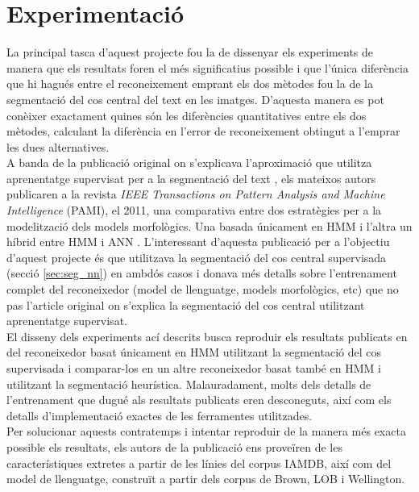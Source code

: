 \chapter{Experimentació} 
\label{cap:exp}
La principal tasca d'aquest projecte fou la de dissenyar els experiments de manera que els resultats foren el més significatius possible i que l'única diferència que hi hagués entre el reconeixement emprant els dos mètodes fou la de la segmentació del cos central del text en les imatges. D'aquesta manera es pot conèixer exactament quines són les diferències quantitatives entre els dos mètodes, calculant la diferència en l'error de reconeixement obtingut a l'emprar les dues alternatives.\\

A banda de la publicació original on s'explicava l'apro\-xi\-ma\-ció que utilitza aprenentatge supervisat per a la segmentació del text \cite{DBLP:conf/pris/Gorbe-MoyaEZB08}, els mateixos autors publicaren a la revista \emph{IEEE Transactions on Pattern Analysis and Machine Intelligence} (PAMI), el 2011, una comparativa entre dos estratègies per a la modelització dels models morfològics. Una basada únicament en HMM i l'altra un híbrid entre HMM i ANN \cite{espana2011improving}. L'interessant d'aquesta publicació per a l'objectiu d'aquest projecte és que utilitzava la segmentació del cos central supervisada (secció \ref{sec:seg_nn}) en ambdós casos i donava més detalls sobre l'entrenament complet del reconeixedor (model de llenguatge, models morfològics, etc) que no pas l'article original on s'explica la segmentació del cos central utilitzant aprenentatge supervisat.\\

El disseny dels experiments ací descrits busca reproduir els resultats publicats en \cite{espana2011improving} del reconeixedor basat únicament en HMM utilitzant la segmentació del cos supervisada i comparar-los en un altre reconeixedor basat també en HMM i utilitzant la segmentació heurística. Malauradament, molts dels detalls de l'entrenament que dugué als resultats publicats eren desconeguts, així com els detalls d'implementació exactes de les ferramentes utilitzades.\\

Per solucionar aquests contratemps i intentar reproduir de la manera més exacta possible els resultats, els autors de la publicació ens proveïren de les característiques extretes a partir de les línies del corpus IAMDB, així com del model de llenguatge, construït a partir dels corpus de Brown, LOB i Wellington.

